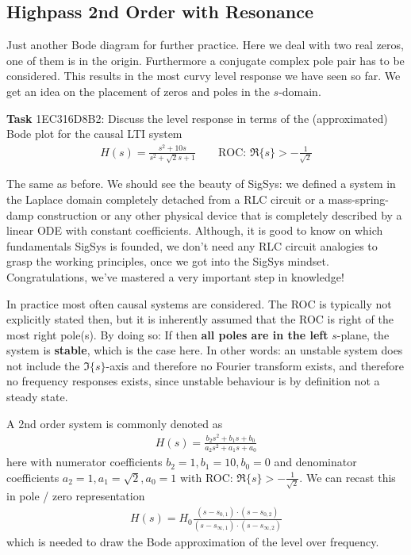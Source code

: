 \subsection{Highpass 2nd Order with Resonance}
\label{sec:1EC316D8B2}
\begin{Ziel}
Just another Bode diagram for further practice. Here we deal with two real zeros,
one of them is in the origin. Furthermore a conjugate complex pole pair has to be
considered. This results in the most curvy level response we have seen so far.
We get an idea on the placement of zeros and poles in the $s$-domain.
\end{Ziel}
\textbf{Task} {\tiny 1EC316D8B2}:  Discuss the level response in terms
of the (approximated) Bode plot for the causal LTI system
\begin{align}
H(s) = \frac{s^2+10 s}{s^2+\sqrt{2} s +1}\qquad\text{ROC: }
\Re\{s\}>-\frac{1}{\sqrt{2}}
\end{align}
\begin{Werkzeug}
The same as before. We should see the beauty of SigSys: we defined a system
in the Laplace domain completely detached from a RLC circuit or a mass-spring-damp construction or any other physical device that is completely described by a
linear ODE with constant coefficients.
Although, it is good to know on which fundamentals SigSys is founded, we don't need
any RLC circuit analogies to grasp the working principles, once we got into the
SigSys mindset. Congratulations, we've mastered a very important step in knowledge!
\end{Werkzeug}
\begin{Ansatz}
In practice most often causal systems are considered. The ROC is typically
not explicitly stated then, but it is inherently assumed that the ROC is right of the most right pole(s).
By doing so: If then \textbf{all poles are in the left} $s$-plane, the system is \textbf{stable},
which is the case here.
In other words: an unstable system does not include the $\Im\{s\}$-axis and therefore
no Fourier transform exists, and therefore no frequency responses exists, since unstable
behaviour is by definition not a steady state.

A 2nd order system is commonly denoted as
\begin{align}
H(s) = \frac{b_2 s^2+b_1 s + b_0}{a_2 s^2+a_1 s +a_0}
\end{align}
here with numerator coefficients $b_2 = 1, b_1 = 10, b_0=0$ and denominator
coefficients
$a_2 = 1, a_1 = \sqrt{2}, a_0=1$ with ROC: $\Re\{s\}>-\frac{1}{\sqrt{2}}$.
We can recast this in pole / zero representation
\begin{align}
H(s) = H_0\frac{(s-s_{0,1}) \cdot (s-s_{0,2})}{(s-s_{\infty,1}) \cdot (s-s_{\infty,2})}
\end{align}
which is needed to draw the Bode approximation of the level over frequency.
\end{Ansatz}
